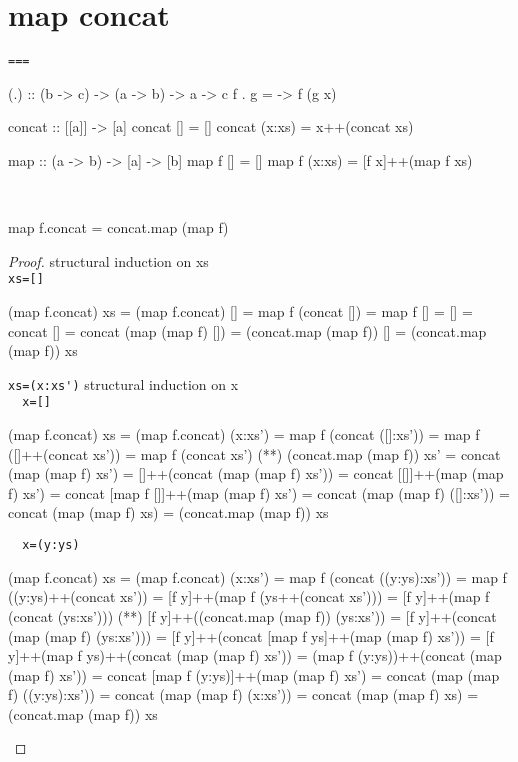 \section{map concat}
\verb|===|\\
\begin{code}
(.) :: (b -> c) -> (a -> b) -> a -> c
f . g = \x -> f (g x)
\end{code}
\begin{code}
concat :: [[a]] -> [a]
concat []     = []
concat (x:xs) = x++(concat xs)
\end{code}
\begin{code}
map :: (a -> b) -> [a] -> [b] 
map f []     = []
map f (x:xs) = [f x]++(map f xs)
\end{code}
\begin{claim}\ 
\begin{code}
map f.concat = concat.map (map f)
\end{code}
\end{claim}
\begin{proof}structural induction on xs\\
\verb|xs=[]|
\begin{code}
(map f.concat) xs = (map f.concat) []
                  = map f (concat [])
                  = map f []
                  = []
                  = concat []
                  = concat (map (map f) [])
                  = (concat.map (map f)) []
                  = (concat.map (map f)) xs
\end{code}
\verb|xs=(x:xs')|
structural induction on x\\
\verb|  x=[]|
\begin{code}
(map f.concat) xs = (map f.concat) (x:xs')
                  = map f (concat ([]:xs'))
                  = map f ([]++(concat xs'))
                  = map f (concat xs')
                  (**) (concat.map (map f)) xs'
                  = concat (map (map f) xs')
                  = []++(concat (map (map f) xs'))
                  = concat [[]]++(map (map f) xs')
                  = concat [map f []]++(map (map f) xs')
                  = concat (map (map f) ([]:xs'))
                  = concat (map (map f) xs)
                  = (concat.map (map f)) xs
\end{code}
\verb|  x=(y:ys)|
\begin{code}
(map f.concat) xs = (map f.concat) (x:xs')
                  = map f (concat ((y:ys):xs'))
                  = map f ((y:ys)++(concat xs'))
                  = [f y]++(map f (ys++(concat xs')))
                  = [f y]++(map f (concat (ys:xs')))
                  (**) [f y]++((concat.map (map f)) (ys:xs'))
                  = [f y]++(concat (map (map f) (ys:xs')))
                  = [f y]++(concat [map f ys]++(map (map f) xs'))
                  = [f y]++(map f ys)++(concat (map (map f) xs'))
                  = (map f (y:ys))++(concat (map (map f) xs'))
                  = concat [map f (y:ys)]++(map (map f) xs')
                  = concat (map (map f) ((y:ys):xs'))
                  = concat (map (map f) (x:xs'))
                  = concat (map (map f) xs)
                  = (concat.map (map f)) xs
\end{code}
\end{proof}

